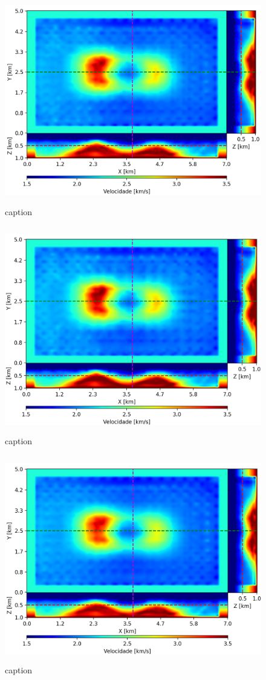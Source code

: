 \begin{figure}[H]
	\centering
	\includegraphics[width=12cm,height=9cm]{Imgs/Resultados/pod_refined.png}
	\caption{caption}
	\label{fig:}	
\end{figure}


\begin{figure}[H]
	\centering
	\includegraphics[width=12cm,height=9cm]{Imgs/Resultados/fim_refined.png}
	\caption{caption}
	\label{fig:}	
\end{figure}


\begin{figure}[H]
	\centering
	\includegraphics[width=12cm,height=9cm]{Imgs/Resultados/fsm_refined.png}
	\caption{caption}
	\label{fig:}	
\end{figure}





